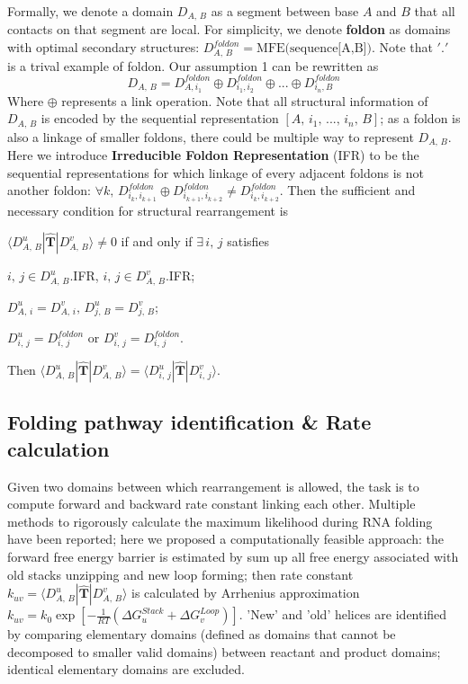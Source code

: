 \documentclass[11pt, a4paper]{article}
\begin{document}
Formally, we denote a domain $D_{A,\,B}$ as a segment between base $A$ and $B$ that all contacts on that segment are local. For simplicity, we denote \textbf{foldon}
as domains with optimal secondary structures: $D^{foldon}_{A,\,B} = \text{MFE(sequence[A,B])}$. Note that $'.'$ is a trival example of foldon.
Our assumption 1 can be rewritten as
\begin{equation}
  D_{A,\,B} = D^{foldon}_{A, i_1} \oplus D^{foldon}_{i_1, i_2} \oplus ... \oplus D^{foldon}_{i_n, B}
\end{equation}
Where $\oplus$ represents a link operation. Note that all structural information of $D_{A,\,B}$ is encoded by the sequential representation $[A,\, i_1,\, ...,\, i_n,\, B]$;
 as a foldon is also a linkage of smaller foldons, there could be multiple way to represent $D_{A,\,B}$. Here we introduce \textbf{Irreducible Foldon Representation} (IFR) to be the
 sequential representations for which linkage of every adjacent foldons is not another foldon: $\forall k,\, D^{foldon}_{i_k, i_{k+1}} \oplus D^{foldon}_{i_{k+1}, i_{k+2}} \neq D^{foldon}_{i_{k}, i_{k+2}}$.
 Then the sufficient and necessary condition for structural rearrangement is

\begin{center}
  $\langle D^{u}_{A,\,B} | \hat{\mathbf{T}} | D^{v}_{A,\,B} \rangle \neq 0$ if and only if $\exists\, i,\,j$ satisfies

  $i,\,j \in D^{u}_{A,\,B}$.IFR, $i,\,j \in D^{v}_{A,\,B}$.IFR;

  $D^{u}_{A,\,i} = D^{v}_{A,\,i},\, D^{u}_{j,\,B} = D^{v}_{j,\,B}$;

  $D^{u}_{i,\,j} = D^{foldon}_{i,\,j}$ or $D^{v}_{i,\,j} = D^{foldon}_{i,\,j}$.

  Then $\langle D^{u}_{A,\,B} | \hat{\mathbf{T}} | D^{v}_{A,\,B} \rangle = \langle D^{u}_{i,\,j} | \hat{\mathbf{T}} | D^{v}_{i,\,j} \rangle$.
\end{center}

\subsection{Folding pathway identification \& Rate calculation} \label{section:rate}

Given two domains between which rearrangement is allowed, the task is to compute forward and backward rate constant
linking each other. Multiple methods to rigorously calculate the maximum likelihood during RNA folding have been reported;
here we proposed a computationally feasible approach: the forward free energy barrier is estimated by sum up all free energy associated
with old stacks unzipping and new loop forming; then rate constant $k_{uv} = \langle D^{u}_{A,\,B} | \hat{\mathbf{T}} | D^{v}_{A,\,B} \rangle $ is calculated by Arrhenius approximation $k_{uv} = k_0 \exp[-\frac{1}{RT}(\Delta G^{Stack}_{u}+\Delta G^{Loop}_{v})]$. 'New' and 'old' helices are identified by comparing elementary domains (defined as domains that cannot be decomposed to smaller valid domains) between reactant and product domains; identical elementary domains are excluded.
\end{document}
